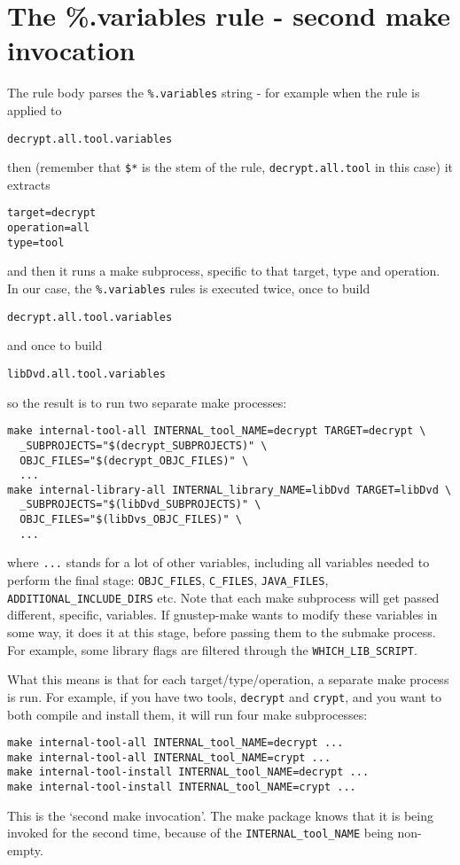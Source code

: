 \documentclass[a4paper]{article}
\begin{document}
\section{The \%.variables rule - second make invocation}
The rule body parses the \texttt{\%.variables} string - for example when
the rule is applied to
\begin{verbatim}
decrypt.all.tool.variables
\end{verbatim}
then (remember that \texttt{\$*} is the stem of the rule,
\texttt{decrypt.all.tool} in this case) it extracts
\begin{verbatim}
target=decrypt
operation=all
type=tool
\end{verbatim}
and then it runs a make subprocess, specific to that target, type and
operation.  In our case, the \texttt{\%.variables} rules is executed
twice, once to build 
\begin{verbatim}
decrypt.all.tool.variables
\end{verbatim}
and once to build
\begin{verbatim}
libDvd.all.tool.variables
\end{verbatim}
so the result is to run two separate make processes:
\begin{verbatim}
make internal-tool-all INTERNAL_tool_NAME=decrypt TARGET=decrypt \
  _SUBPROJECTS="$(decrypt_SUBPROJECTS)" \
  OBJC_FILES="$(decrypt_OBJC_FILES)" \
  ...
make internal-library-all INTERNAL_library_NAME=libDvd TARGET=libDvd \
  _SUBPROJECTS="$(libDvd_SUBPROJECTS)" \
  OBJC_FILES="$(libDvs_OBJC_FILES)" \
  ...
\end{verbatim}
where \texttt{...} stands for a lot of other variables, including all
variables needed to perform the final stage: \texttt{OBJC\_FILES},
\texttt{C\_FILES}, \texttt{JAVA\_FILES},
\texttt{ADDITIONAL\_INCLUDE\_DIRS} etc.  Note that each make
subprocess will get passed different, specific, variables.  If
gnustep-make wants to modify these variables in some way, it does it
at this stage, before passing them to the submake process.  For
example, some library flags are filtered through the
\texttt{WHICH\_LIB\_SCRIPT}.

What this means is that for each target/type/operation, a separate
make process is run.  For example, if you have two tools,
\texttt{decrypt} and \texttt{crypt}, and you want to both compile and install
them, it will run four make subprocesses:
\begin{verbatim}
make internal-tool-all INTERNAL_tool_NAME=decrypt ...
make internal-tool-all INTERNAL_tool_NAME=crypt ...
make internal-tool-install INTERNAL_tool_NAME=decrypt ...
make internal-tool-install INTERNAL_tool_NAME=crypt ...
\end{verbatim}
This is the `second make invocation'.  The make package knows that it
is being invoked for the second time, because of the
\texttt{INTERNAL\_tool\_NAME} being non-empty.
\end{document}
